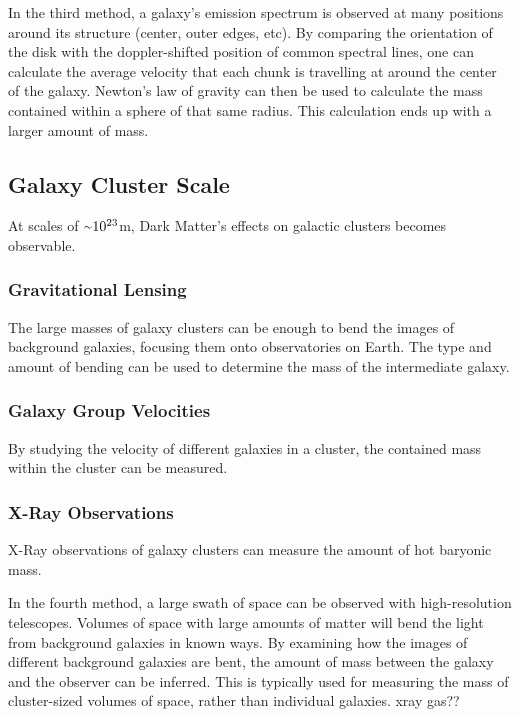 In the third method, a galaxy's emission spectrum is observed at many positions around its structure (center, outer edges, etc).
By comparing the orientation of the disk with the doppler-shifted position of common spectral lines, one can calculate the average velocity that each chunk is travelling at around the center of the galaxy.
Newton's law of gravity can then be used to calculate the mass contained within a sphere of that same radius.
This calculation ends up with a larger amount of mass.

\subsection{Galaxy Cluster Scale}
%
At scales of $\nicetilde 10^{23}$m, Dark Matter's effects on galactic clusters becomes observable.

\subsubsection{Gravitational Lensing}
The large masses of galaxy clusters can be enough to bend the images of background galaxies, focusing them onto observatories on Earth.
The type and amount of bending can be used to determine the mass of the intermediate galaxy.

\subsubsection{Galaxy Group Velocities}

By studying the velocity of different galaxies in a cluster, the contained mass within the cluster can be measured.

\subsubsection{X-Ray Observations}
X-Ray observations of galaxy clusters can measure the amount of hot baryonic mass.


In the fourth method, a large swath of space can be observed with high-resolution telescopes.
Volumes of space with large amounts of matter will bend the light from background galaxies in known ways.
By examining how the images of different background galaxies are bent, the amount of mass between the galaxy and the observer can be inferred.
This is typically used for measuring the mass of cluster-sized volumes of space, rather than individual galaxies.
xray gas??

